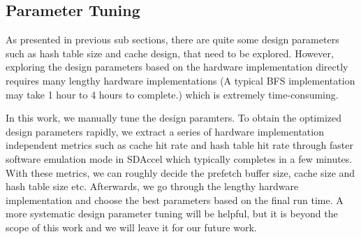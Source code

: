 \subsection{Parameter Tuning}
As presented in previous sub sections, there are quite some design 
parameters such as hash table size and cache design, 
that need to be explored. However, exploring the design parameters 
based on the hardware implementation directly requires many lengthy 
hardware implementations (A typical BFS implementation may 
take 1 hour to 4 hours to complete.) which is extremely time-consuming.

In this work, we manually tune the design paramters. To obtain the optimized 
design parameters rapidly, we extract a series of hardware implementation independent 
metrics such as cache hit rate and hash table hit rate 
through faster software emulation mode in SDAccel which typically completes in a few minutes.
With these metrics, we can roughly decide the prefetch buffer size, 
cache size and hash table size etc. Afterwards, we go through the lengthy 
hardware implementation and choose the best parameters based on the final 
run time. A more systematic design parameter tuning will be helpful, but it 
is beyond the scope of this work and we will leave it for our future work.

%
%
%

